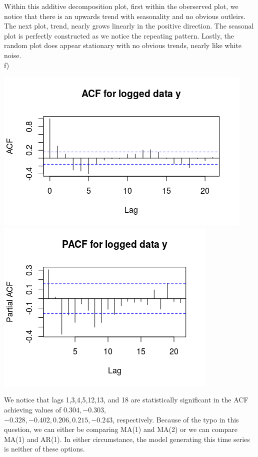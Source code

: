 \documentclass[11pt]{article}
\begin{document}
Within this additive decomposition plot, first within the oberserved plot, we notice that there is an upwards trend with seasonality and no obvious outleirs. The next plot, trend, nearly grows linearly in the positive direction. The seasonal plot is perfectly constructed as we notice the repeating pattern. Lastly, the random plot does appear stationary with no obvious trends, nearly like white noise.  
\\
f)  
\begin{center}
	\includegraphics[scale=1]{plt4f1}
	\includegraphics[scale=1]{plt4f2}
\end{center}

We notice that lags 1,3,4,5,12,13, and 18 are statistically significant in the ACF achieving values of $0.304, -0.303, $ \\
$ -0.328, -0.402, 0.206, 0.215, -0.243$, respectively. Because of the typo in this question, we can either be comparing MA(1) and MA(2) or we can compare MA(1) and AR(1). In either circumstance, the model generating this time series is neither of these options. \\\\
\end{document}
